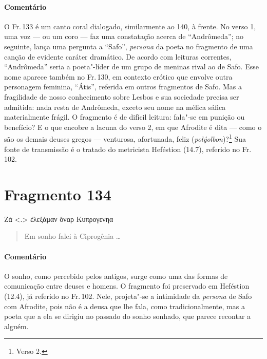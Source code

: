 \medskip

{\paragraph{Comentário} O Fr.\,133 é um canto coral dialogado, similarmente ao 140, à frente. No verso 1, uma voz --- ou um coro --- faz uma constatação acerca de ``Andrômeda''; no seguinte,
lança uma pergunta a ``Safo'', \emph{persona }da poeta no fragmento de
uma canção de evidente caráter dramático. De acordo com leituras correntes,
``Andrômeda'' seria a poeta"-líder de um grupo de
meninas rival ao de Safo. Esse nome aparece também no Fr.\,130, em contexto
erótico que envolve outra personagem feminina, ``Átis'', referida em
outros fragmentos de Safo. Mas a fragilidade de nosso conhecimento sobre Lesbos
e sua sociedade precisa ser admitida: nada resta de Andrômeda, exceto seu nome
na mélica sáfica materialmente frágil. O fragmento é de difícil leitura:
fala"-se em punição ou benefício? E o que encobre a lacuna do verso 2, em que
Afrodite é dita --- como o são os demais deuses gregos --- venturosa, afortunada, 
feliz (\emph{polýolbon})?\footnote{Verso 2.} Sua fonte de transmissão é o tratado do metricista Heféstion (14.7), referido
no Fr.\,102.}



\section{Fragmento 134}

\begin{gkverse}
Ζὰ <.> ἐλεξάμαν ὄναρ Κυπρογενηα
\end{gkverse}

\begin{verse}
Em sonho falei à Ciprogênia \ldots{}
\end{verse}

\medskip

\paragraph{Comentário} O sonho, como percebido pelos antigos, surge como uma das formas de 
comunicação entre deuses e homens. O fragmento foi preservado em Heféstion (12.4), já
referido no Fr.\,102. Nele, projeta"-se a intimidade da \emph{persona} de Safo com Afrodite, pois não é a deusa que lhe fala, como tradicionalmente, mas a poeta que a ela se dirigiu no passado do sonho sonhado, que parece recontar a alguém.



